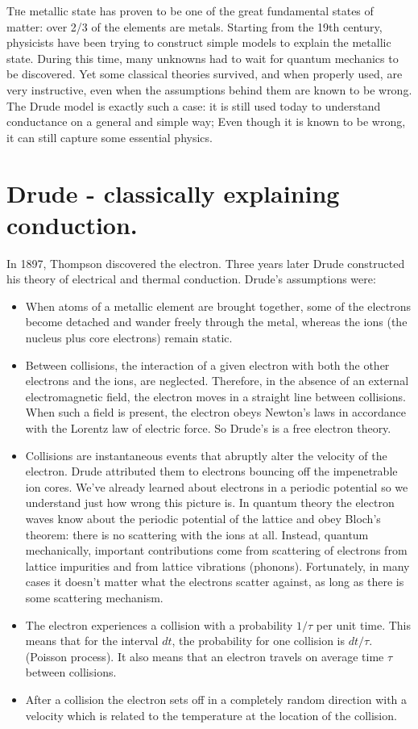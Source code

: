 \documentclass{Textbook}
\begin{document}
\lettrine[lines=3,slope=6pt,nindent=6pt]{\initfamily T}{h}e metallic state has proven to be one of the great fundamental states of matter: over 2/3 of the elements are metals. Starting from the 19th century, physicists have been trying to construct simple models to explain the metallic state. During this time, many unknowns had to wait for quantum mechanics to be discovered. Yet some classical theories survived, and when properly used, are very instructive, even when the assumptions behind them are known to be wrong. The Drude model is exactly such a case: it is still used today to understand conductance on a general and simple way; Even though it is known to be wrong, it can still capture some essential physics.
\section{Drude - classically explaining conduction.}
In 1897, Thompson discovered the electron. Three years later Drude constructed his theory of electrical and thermal conduction. Drude's assumptions were:
\begin{itemize}
\item When atoms of a metallic element are brought together, some of the electrons become detached and wander freely through the metal, whereas the ions (the nucleus plus core electrons) remain static. 
\item Between collisions, the interaction of a given electron with both the other electrons and the ions, are neglected. Therefore, in the absence of an external electromagnetic field, the electron moves in a straight line between collisions. When such a field is present, the electron obeys Newton's laws in accordance with the Lorentz law of electric force. So Drude's is a free electron theory.
\item Collisions are instantaneous events that abruptly alter the velocity of the electron. Drude attributed them to electrons bouncing off the impenetrable ion cores. We've already learned about electrons in a periodic potential so we understand just how wrong this picture is. In quantum theory the electron waves know about the periodic potential of the lattice and obey Bloch's theorem: there is no scattering with the ions at all. Instead, quantum mechanically, important contributions come from scattering of electrons from lattice impurities and from lattice vibrations (phonons). Fortunately, in many cases it doesn't matter what the electrons scatter against, as long as there is some scattering mechanism.
\item The electron experiences a collision with a probability $1/\tau$ per unit time. This means that for the interval $dt$, the probability for one collision is $dt/\tau$. (Poisson process). It also means that an electron travels on average time $\tau$ between collisions. 
\item After a collision the electron sets off in a completely random direction with a velocity which is related to the temperature at the location of the collision.
\end{itemize}  
\end{document}
